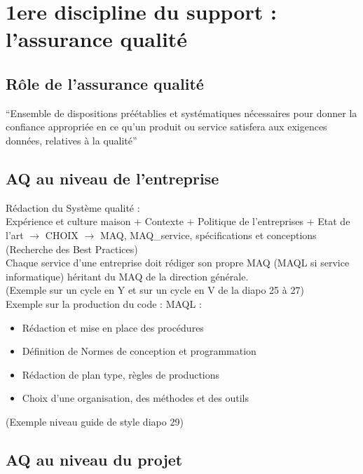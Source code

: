 \section{1ere discipline du support : l'assurance qualité}

	\subsection{Rôle de l’assurance qualité}

“Ensemble de dispositions préétablies et systématiques nécessaires pour donner la confiance appropriée en ce qu’un produit ou service satisfera aux exigences données, relatives à la qualité”


	\subsection{AQ au niveau de l’entreprise}

Rédaction du Système qualité :\\
	Expérience et culture maison + Contexte + Politique de l’entreprises + Etat de l’art
		$\rightarrow$ CHOIX $\rightarrow$ MAQ, MAQ\_service, spécifications et conceptions\\
			(Recherche des Best Practices)\\

Chaque service d’une entreprise doit rédiger son propre MAQ (MAQL si service informatique) héritant du MAQ de la direction générale.\\

(Exemple sur un cycle en Y et sur un cycle en V de la diapo 25 à 27)\\

Exemple sur la production du code : MAQL :
\begin{itemize}
\item Rédaction et mise en place des procédures
\item Définition de Normes de conception et programmation
\item Rédaction de plan type, règles de productions
\item Choix d’une organisation, des méthodes et des outils
\end{itemize}

(Exemple niveau guide de style diapo 29)

	\subsection{AQ au niveau du projet}

